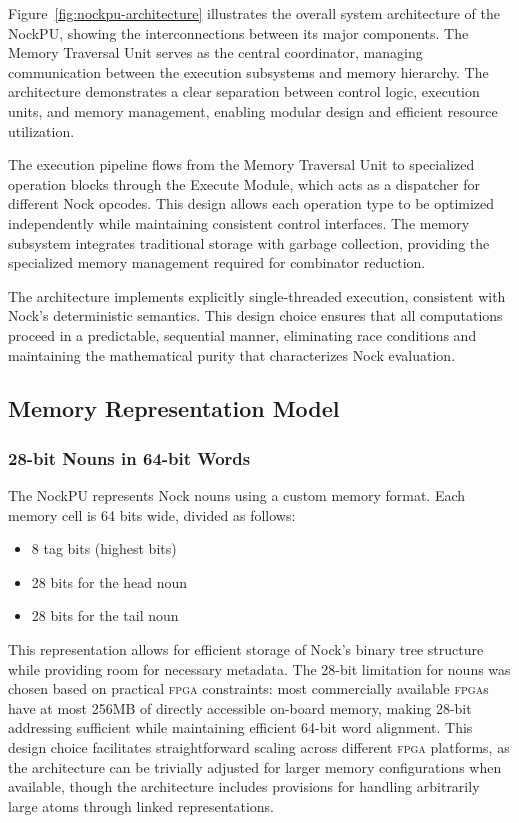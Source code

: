 \documentclass[twoside]{article}
\begin{document}
\noindent\sloppy
Figure~\ref{fig:nockpu-architecture} illustrates the overall system architecture of the NockPU, showing the interconnections between its major components. The Memory Traversal Unit serves as the central coordinator, managing communication between the execution subsystems and memory hierarchy. The architecture demonstrates a clear separation between control logic, execution units, and memory management, enabling modular design and efficient resource utilization.



The execution pipeline flows from the Memory Traversal Unit to specialized operation blocks through the Execute Module, which acts as a dispatcher for different Nock opcodes. This design allows each operation type to be optimized independently while maintaining consistent control interfaces. The memory subsystem integrates traditional storage with garbage collection, providing the specialized memory management required for combinator reduction.

The architecture implements explicitly single-threaded execution, consistent with Nock's deterministic semantics. This design choice ensures that all computations proceed in a predictable, sequential manner, eliminating race conditions and maintaining the mathematical purity that characterizes Nock evaluation.

\subsection{Memory Representation Model}

\subsubsection{28-bit Nouns in 64-bit Words}

The NockPU represents Nock nouns using a custom memory format. Each memory cell is 64 bits wide, divided as follows:

\begin{itemize}
  \item 8 tag bits (highest bits)
  \item 28 bits for the head noun
  \item 28 bits for the tail noun
\end{itemize}

\noindent
This representation allows for efficient storage of Nock's binary tree structure while providing room for necessary metadata. The 28-bit limitation for nouns was chosen based on practical \textsc{fpga} constraints: most commercially available \textsc{fpga}s have at most 256MB of directly accessible on-board memory, making 28-bit addressing sufficient while maintaining efficient 64-bit word alignment. This design choice facilitates straightforward scaling across different \textsc{fpga} platforms, as the architecture can be trivially adjusted for larger memory configurations when available, though the architecture includes provisions for handling arbitrarily large atoms through linked representations.
\end{document}
